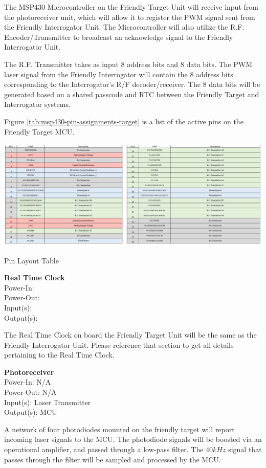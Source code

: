 \documentclass[letterpaper,10pt]{article}
\begin{document}
\begin{spacing}{1.15}
The MSP430 Microcontroller on the Friendly Target Unit will receive input from the photoreceiver unit, which will allow it to register the PWM signal sent from the Friendly Interrogator Unit. The Microcontroller will also utilize the R.F. Encoder/Transmitter to broadcast an acknowledge signal to the Friendly Interrogator Unit. 

The R.F. Transmitter takes as input 8 address bits and 8 data bits. The PWM laser signal from the Friendly Interrogator will contain the 8 address bits corresponding to the Interrogator's R/F decoder/receiver. The 8 data bits will be generated based on a shared passcode and RTC between the Friendly Target and Interrogator systems. 

Figure \ref{tab:msp430-pin-assignments-target} is a list of the active pins on the Friendly Target MCU. 

\begin{table} [H]
	\centering
		\includegraphics[scale=0.52]{MSP430_Pin_Assignments-Target.png}
	\caption{Pin Layout Table\label{tab:msp430-pin-assignments-target}}
\end{table}

\normalsize\textbf{Real Time Clock} \\
Power-In: \\
Power-Out: \\
Input(s): \\
Output(s):

The Real Time Clock on board the Friendly Target Unit will be the same as the Friendly Interrogator Unit. Please reference that section to get all details pertaining to the Real Time Clock.

\normalsize\textbf{Photoreceiver}\\
Power-In: N/A \\
Power-Out: N/A \\
Input(s): Laser Transmitter \\
Output(s): MCU

A network of four photodiodes mounted on the friendly target will report incoming laser signals to the MCU. The photodiode signals will be boosted via an operational amplifier, and passed through a low-pass filter. The $40kHz$ signal that passes through the filter will be sampled and processed by the MCU. 


\end{spacing}
\end{document}
